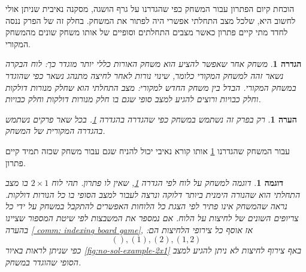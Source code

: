 \documentclass[12pt,leqno]{article}
\theoremstyle{theoremdd}
\newtheorem{definition}{הגדרה}[section]
\newtheorem{example}{דוגמה}[section]
\newtheorem{comm}{הערה}[section]
\begin{document}
הוכחת קיום הפתרון עבור המשחק כפי שהגדרנו  על גרף הושגה,
מסקנה נאיבית שניתן אולי לחשוב היא,
שלכל מצב התחלתי
אפשרי היה לפתור את המשחק. בחלק זה של הפרק ננסה לחדד מתי קיים פתרון כאשר
מצבים התחלתים וסופיים של אותו משחק שונים מהמשחק המקורי.
\begin{definition}
    \label{def:diff-game}
    משחק אחר שאפשר להציע הוא משחק האורות כללי יותר מוגדר כך:
    לוח הבקרה נשאר זהה למשחק המקורי כלומר, שינוי נורות 
    לאחר לחיצה מתנהג נשאר כפי שהוגדר במשחק המקורי.
    הבדל בין משחק החדש למקורי:
    מצב התחלתי הוא שחלק מנורות דולקות וחלק כבויות
    ורוצים להגיע למצב סופי שגם בו חלק מנורות דולקות וחלק כבויות.
\end{definition}
\begin{comm}
    רק בפרק זה נשתמש במשחק כפי שהגדרה 
    בהגדרה 
    \ref{def:diff-game}.
    בכל שאר פרקים נשתמש בהגדרה המקורית של המשחק.
\end{comm}
עבור המשחק שהגדרנו 
\ref{def:diff-game}
אותו קורא נאיבי יכול להניח שגם עבור משחק שכזה תמיד קיים פתרון.
\begin{example}
    דוגמה למשחק על לוח 
    לפי 
    הגדרה 
    \ref{def:diff-game},
    שאין לו פתרון.
    תהי לוח 
    $2 \times 1$
    בו מצב התחלתי הוא שהנורה הימנית ביותר דלוקה ונרצה לעבור למצב הסופי בו כל 
    הנורות דולקות.
    נראה 
    שהמשחק אינו פתיר
    לפי 
    הצגת כל הלוחות האפשרים 
    להתקבל
    במשחק על ידי 
    כל
    צריופים השונים של לחיצות על הלוח.
    אם נמספר את המשבצות לפי שיטת המספור שציינו בהערה 
    \ref{ comm: indexing board game},
    אז אוסף כל צירופי הלחיצות הם:
    \[
        (), (1), (2), (1,2)
    \]
    כפי שניתן לראות 
    באיור 
    \ref{fig:no-sol-example-2x1}
    באף צירוף לחיצות לא ניתן להגיע למצב הסופי שהוגדר במשחק.
\end{example}
\end{document}
